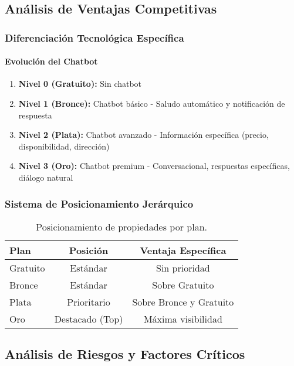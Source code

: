 	\subsection{Análisis de Ventajas Competitivas}
		\subsubsection{Diferenciación Tecnológica Específica}
			\paragraph{Evolución del Chatbot}
			\begin{enumerate}
				\item \textbf{Nivel 0 (Gratuito):} Sin chatbot
				\item \textbf{Nivel 1 (Bronce):} Chatbot básico - Saludo automático y notificación de respuesta
				\item \textbf{Nivel 2 (Plata):} Chatbot avanzado - Información específica (precio, disponibilidad, dirección)
				\item \textbf{Nivel 3 (Oro):} Chatbot premium - Conversacional, respuestas específicas, diálogo natural
			\end{enumerate}
	
	\newpage
	\subsubsection{Sistema de Posicionamiento Jerárquico}
		\begin{table}[h]
			\centering
			\begin{tabular}{|l|c|c|}
				\hline
				\textbf{Plan} & \textbf{Posición} & \textbf{Ventaja Específica} \\
				\hline
				Gratuito & Estándar & Sin prioridad \\
				Bronce & Estándar & Sobre Gratuito \\
				Plata & Prioritario & Sobre Bronce y Gratuito \\
				Oro & Destacado (Top) & Máxima visibilidad \\
				\hline
			\end{tabular}
			\caption{Posicionamiento de propiedades por plan.}
			\label{tab:posicionamiento}
		\end{table}
	
	\subsection{Análisis de Riesgos y Factores Críticos}
